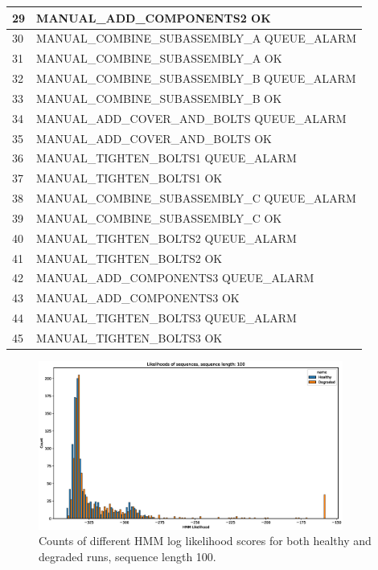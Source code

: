 \documentclass[journal]{IEEEtran}
\begin{document}
\begin{table}[!t]
\begin{tabular}{|p{5mm}|p{55mm}|}
29 & MANUAL\_ADD\_COMPONENTS2 OK \\
\hline
30 & MANUAL\_COMBINE\_SUBASSEMBLY\_A QUEUE\_ALARM \\
\hline
31 & MANUAL\_COMBINE\_SUBASSEMBLY\_A OK \\
\hline
32 & MANUAL\_COMBINE\_SUBASSEMBLY\_B QUEUE\_ALARM \\
\hline
33 & MANUAL\_COMBINE\_SUBASSEMBLY\_B OK \\
\hline
34 & MANUAL\_ADD\_COVER\_AND\_BOLTS QUEUE\_ALARM \\
\hline
35 & MANUAL\_ADD\_COVER\_AND\_BOLTS OK \\
\hline
36 & MANUAL\_TIGHTEN\_BOLTS1 QUEUE\_ALARM \\
\hline
37 & MANUAL\_TIGHTEN\_BOLTS1 OK \\
\hline
38 & MANUAL\_COMBINE\_SUBASSEMBLY\_C QUEUE\_ALARM \\
\hline
39 & MANUAL\_COMBINE\_SUBASSEMBLY\_C OK \\
\hline
40 & MANUAL\_TIGHTEN\_BOLTS2 QUEUE\_ALARM \\
\hline
41 & MANUAL\_TIGHTEN\_BOLTS2 OK \\
\hline
42 & MANUAL\_ADD\_COMPONENTS3 QUEUE\_ALARM \\
\hline
43 & MANUAL\_ADD\_COMPONENTS3 OK \\
\hline
44 & MANUAL\_TIGHTEN\_BOLTS3 QUEUE\_ALARM \\
\hline
45 & MANUAL\_TIGHTEN\_BOLTS3 OK \\
\hline
\end{tabular}
\end{table}

\begin{figure}[tb]
 \centering
 \includegraphics[width=10cm,keepaspectratio=true]{./hmm_histograms_100.eps}
 \caption{Counts of different HMM log likelihood scores for both healthy and degraded runs, sequence length 100.}
 \label{figure:log_likelihood_100}
\end{figure}
\end{document}

